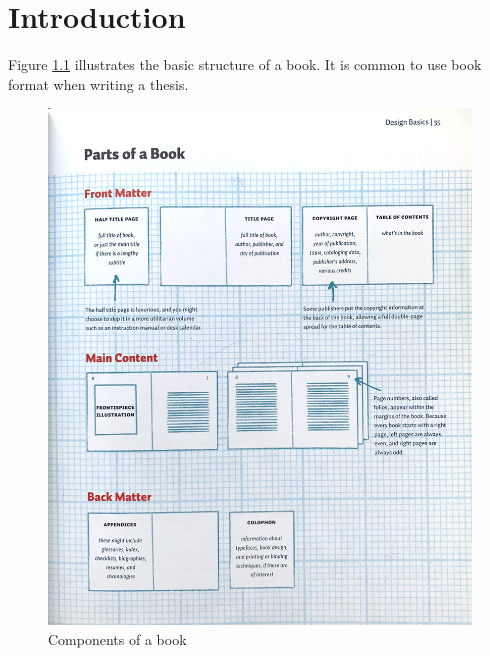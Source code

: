 \chapter{Introduction}

Figure \ref{book_design} illustrates the basic structure of a book. It is common to use book format when writing a thesis\cite{Mori2008}. 

\begin{figure}[h]
    \centering
    \includegraphics[width=15cm]{structure/main_matter/figures/book_design.png}
    \caption{Components of a book}
    \label{book_design}
\end{figure}

